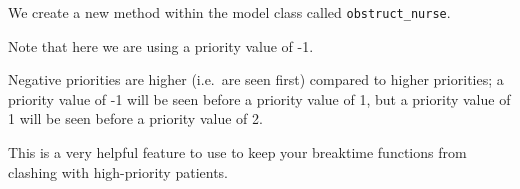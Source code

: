 \documentclass[
  letterpaper,
  DIV=11,
  numbers=noendperiod]{scrreprt}
\begin{document}
We create a new method within the model class called
\texttt{obstruct\_nurse}.

\begin{tcolorbox}[enhanced jigsaw, colframe=quarto-callout-tip-color-frame, bottomtitle=1mm, breakable, rightrule=.15mm, coltitle=black, colbacktitle=quarto-callout-tip-color!10!white, opacityback=0, leftrule=.75mm, arc=.35mm, toptitle=1mm, title=\textcolor{quarto-callout-tip-color}{\faLightbulb}\hspace{0.5em}{Tip}, titlerule=0mm, colback=white, toprule=.15mm, bottomrule=.15mm, left=2mm, opacitybacktitle=0.6]

Note that here we are using a priority value of -1.

Negative priorities are higher (i.e.~are seen first) compared to higher
priorities; a priority value of -1 will be seen before a priority value
of 1, but a priority value of 1 will be seen before a priority value of
2.

This is a very helpful feature to use to keep your breaktime functions
from clashing with high-priority patients.

\end{tcolorbox}
\end{document}
